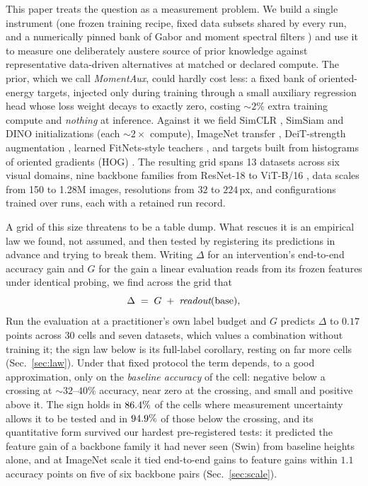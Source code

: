 This paper treats the question as a measurement problem. We build a single
instrument (one frozen training recipe, fixed data subsets shared by every run,
and a numerically pinned bank of Gabor and moment spectral filters
\citep{luan2018gaborcnn,bruna2013scattering}) and use it
to measure one deliberately austere source of prior knowledge against
representative data-driven alternatives at matched or declared compute. The
prior, which we call \emph{MomentAux}, could hardly cost less: a fixed bank of
oriented-energy targets, injected only during training through a small
auxiliary regression head whose loss weight decays to exactly zero, costing
${\sim}2\%$ extra training compute and \emph{nothing} at inference. Against it
we field SimCLR \citep{chen2020simclr}, SimSiam \citep{chen2021simsiam} and
DINO \citep{caron2021dino} initializations (each ${\sim}2\times$
compute), ImageNet transfer \citep{he2019rethinking}, DeiT-strength
augmentation \citep{touvron2021deit}, learned FitNets-style
teachers \citep{romero2015fitnets}, and targets built from histograms of
oriented gradients (HOG) \citep{dalal2005hog}. The
resulting grid spans 13 datasets across six visual domains, nine backbone
families from ResNet-18 \citep{he2016resnet} to ViT-B/16
\citep{dosovitskiy2021vit}, data scales from 150 to 1.28M images,
resolutions from $32$ to $224$\,px, and \computeCells{} configurations trained
over \computeRuns{} runs, each with a retained run record.

A grid of this size threatens to be a table dump. What rescues it is an
empirical law we found, not assumed, and then tested by registering its
predictions in advance and trying to break them. Writing $\Delta$ for an
intervention's end-to-end accuracy gain and $G$ for the gain a linear
evaluation \citep{alain2016understanding} reads from its frozen features under
identical probing, we find across the grid that
\begin{equation}
  \Delta \;=\; G \;+\; \textit{readout}(\mathrm{base}),
  \label{eq:law}
\end{equation}
Run the evaluation at a practitioner's own label budget and $G$ predicts
$\Delta$ to $0.17$ points across 30 cells and seven datasets, which values a
combination without training it; the sign law below is its full-label
corollary, resting on far more cells (Sec.~\ref{sec:law}). Under that fixed
protocol the \readout{} term depends, to a good approximation, only on the
\emph{baseline accuracy} of the cell: negative below a crossing at
${\sim}32$--$40\%$ accuracy, near zero at the crossing, and small and positive
above it. The sign holds in $86.4\%$ of the \auditResolvable{} cells
where measurement uncertainty allows it to be tested and in $94.9\%$ of those
below the crossing, and its quantitative form survived our hardest
pre-registered tests: it predicted the feature gain of a backbone family it had
never seen (Swin) from baseline heights alone, and at ImageNet scale it tied
end-to-end gains to feature gains within $1.1$ accuracy points on five of six
backbone pairs (Sec.~\ref{sec:scale}).

